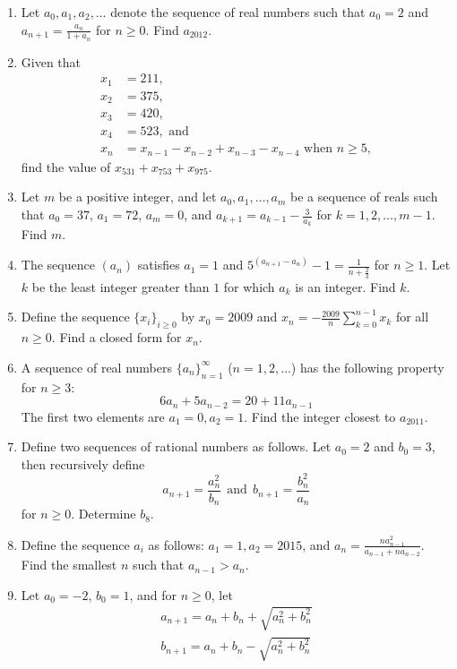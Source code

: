 \documentclass[11pt]{article}
\theoremstyle{theorem}
\theoremstyle{definition}
\theoremstyle{remark}
\theoremstyle{definition}
\theoremstyle{remark}
\begin{document}
\begin{enumerate}
\item Let $a_0, a_1, a_2, \ldots$ denote the sequence of real numbers such that $a_0 = 2$ and $a_{n+1}=\frac{a_n}{1+a_n}$ for $n \ge 0$. Find $a_{2012}$. %
\item Given that
\begin{align*}
x_{1}&=211,\\ 
x_{2}&=375,\\ 
x_{3}&=420,\\ 
x_{4}&=523, \text{ and}\\ 
x_{n}&=x_{n-1}-x_{n-2}+x_{n-3}-x_{n-4} \text{ when } n \geq 5, 
\end{align*}
find the value of $x_{531}+x_{753}+x_{975}$. %
\item Let $m$ be a positive integer, and let $a_0, a_1,\ldots,a_m$ be a sequence of reals such that $a_0=37$, $a_1=72$, $a_m=0$, and $a_{k+1}=a_{k-1}-\frac{3}{a_k}$ for $k=1,2, \dots, m-1$. Find $m$. %
\item The sequence $ (a_n)$ satisfies $ a_1 = 1$ and $ \displaystyle 5^{(a_{n+1}-a_n)} - 1 = \frac{1}{n+\frac{2}{3}}$ for $ n \geq 1$. Let $ k$ be the least integer greater than $ 1$ for which $ a_k$ is an integer. Find $k$. %
\item Define the sequence $\{x_i\}_{i \ge 0}$ by $x_{0}=2009$ and $x_n = -\frac{2009}{n}\sum_{k = 0}^{n-1} x_{k}$ for all $n \ge 0$. Find a closed form for $x_n$. %
\item A sequence of real numbers $\{a_n\}_{n=1}^{\infty}$ ($n = 1,2,\ldots$) has the following property for $n \ge 3$:
\[6a_n + 5a_{n-2} = 20 + 11a_{n-1}\] 
The first two elements are $a_1=0, a_2 = 1$. Find the integer closest to $a_{2011}$.%
\item Define two sequences of rational numbers as follows. Let $a_0=2$ and $b_0=3$, then recursively define
\[a_{n+1} = \frac{a_n^2}{b_n} \ \  \text{and} \ \ b_{n+1} = \frac{b_n^2}{a_n} \] for $n \ge 0$. Determine $b_8$. %
\item Define the sequence $a_i$ as follows: $a_1=1, a_2 = 2015$, and $a_n=\frac{na_{n-1}^2}{a_{n-1}+na_{n-2}}$. Find the smallest $n$ such that $a_{n-1} > a_n$. %
\item Let $a_0=-2$, $b_0=1$, and for $n\ge 0$, let
\begin{align*}
a_{n+1}=a_n+b_n+\sqrt{a_n^2+b_n^2}\\
b_{n+1}=a_n+b_n-\sqrt{a_n^2+b_n^2}
\end{align*}

\end{enumerate}
\end{document}
